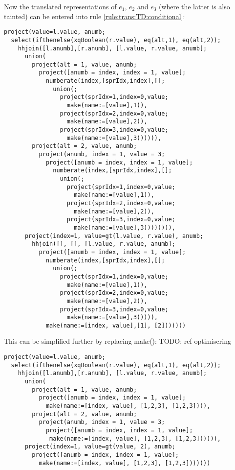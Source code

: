 Now the translated representations of $e_1$, $e_2$ and $e_3$ (where the latter
is also tainted) can be entered into rule \ref{rule:trans:TD:conditional}:

\begin{Verbatim}
project(value=l.value, anumb;
  select(ifthenelse(xqBoolean(r.value), eq(alt,1), eq(alt,2));
    hhjoin([l.anumb],[r.anumb], [l.value, r.value, anumb];
      union(
        project(alt = 1, value, anumb;
          project([anumb = index, index = 1, value];
            numberate(index,[sprIdx,index],[];
              union(;
                project(sprIdx=1,index=0,value;
                  make(name:=[value],1)),
                project(sprIdx=2,index=0,value;
                  make(name:=[value],2)),
                project(sprIdx=3,index=0,value;
                  make(name:=[value],3)))))),
        project(alt = 2, value, anumb;
          project(anumb, index = 1, value = 3;
            project([anumb = index, index = 1, value];
              numberate(index,[sprIdx,index],[];
                union(;
                  project(sprIdx=1,index=0,value;
                    make(name:=[value],1)),
                  project(sprIdx=2,index=0,value;
                    make(name:=[value],2)),
                  project(sprIdx=3,index=0,value;
                    make(name:=[value],3)))))))),
      project(index=1, value=gt(l.value, r.value), anumb;
        hhjoin([], [], [l.value, r.value, anumb];
          project([anumb = index, index = 1, value];
            numberate(index,[sprIdx,index],[];
              union(;
                project(sprIdx=1,index=0,value;
                  make(name:=[value],1)),
                project(sprIdx=2,index=0,value;
                  make(name:=[value],2)),
                project(sprIdx=3,index=0,value;
                  make(name:=[value],3))))),
            make(name:=[index, value],[1], [2]))))))
\end{Verbatim}

This can be simplified further by replacing make(): TODO: ref optimisering

\begin{Verbatim}
project(value=l.value, anumb;
  select(ifthenelse(xqBoolean(r.value), eq(alt,1), eq(alt,2));
    hhjoin([l.anumb],[r.anumb], [l.value, r.value, anumb];
      union(
        project(alt = 1, value, anumb;
          project([anumb = index, index = 1, value];
            make(name:=[index, value], [1,2,3], [1,2,3]))),
        project(alt = 2, value, anumb;
          project(anumb, index = 1, value = 3;
            project([anumb = index, index = 1, value];
             make(name:=[index, value], [1,2,3], [1,2,3]))))),
      project(index=1, value=gt(value, 2), anumb;
        project([anumb = index, index = 1, value];
          make(name:=[index, value], [1,2,3], [1,2,3]))))))
\end{Verbatim}

